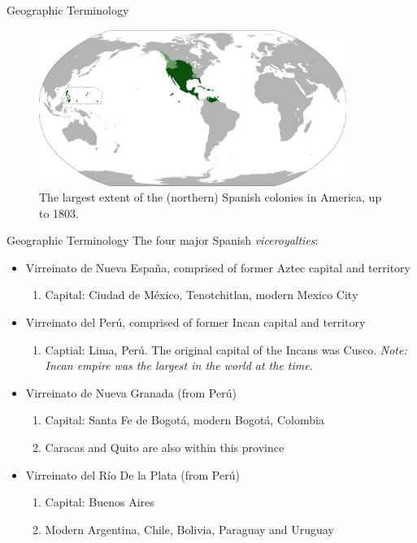 \documentclass{beamer}
\begin{document}
\begin{frame}{Geographic Terminology}
\begin{figure}
\centering
\includegraphics[width=10cm]{figures/vice.png}
\caption{The largest extent of the (northern) Spanish colonies in America, up to 1803.}
\end{figure}
\end{frame}

\begin{frame}{Geographic Terminology}
\small
The four major Spanish \textit{viceroyalties}:
\begin{itemize}
\item Virreinato de Nueva Espa\~{n}a, comprised of former Aztec capital and territory
\begin{enumerate}
\item Capital: Ciudad de M\'{e}xico, Tenotchitlan, modern Mexico City
\end{enumerate}
\item Virreinato del Per\'{u}, comprised of former Incan capital and territory
\begin{enumerate}
\item Captial: Lima, Per\'{u}.  The original capital of the Incans was Cusco.  \textit{Note: Incan empire was the largest in the world at the time.}
\end{enumerate}
\item Virreinato de Nueva Granada (from Per\'{u})
\begin{enumerate}
\item Capital: Santa Fe de Bogot\'{a}, modern Bogot\'{a}, Colombia
\item Caracas and Quito are also within this province
\end{enumerate}
\item Virreinato del R\'{i}o De la Plata (from Per\'{u})
\begin{enumerate}
\item Capital: Buenos Aires
\item Modern Argentina, Chile, Bolivia, Paraguay and Uruguay
\end{enumerate}
\end{itemize}
\end{frame}
\end{document}
